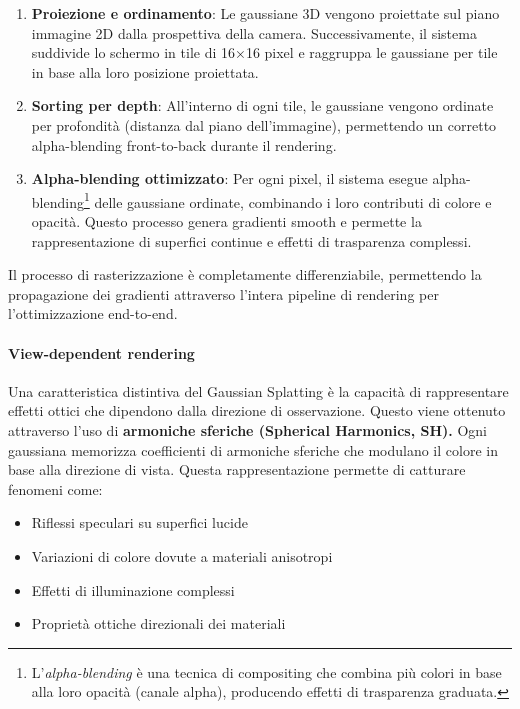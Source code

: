 \begin{enumerate}
    \item \textbf{Proiezione e ordinamento}: Le gaussiane 3D vengono proiettate sul piano immagine 2D dalla prospettiva della camera. Successivamente, il sistema suddivide lo schermo in tile di 16×16 pixel e raggruppa le gaussiane per tile in base alla loro posizione proiettata.
    \item \textbf{Sorting per depth}: All'interno di ogni tile, le gaussiane vengono ordinate per profondità (distanza dal piano dell'immagine), permettendo un corretto alpha-blending front-to-back durante il rendering.
    \item \textbf{Alpha-blending ottimizzato}: Per ogni pixel, il sistema esegue alpha-blending\footnote{L'\textit{alpha-blending} è una tecnica di compositing che combina più colori in base alla loro opacità (canale alpha), producendo effetti di trasparenza graduata.} delle gaussiane ordinate, combinando i loro contributi di colore e opacità. Questo processo genera gradienti smooth e permette la rappresentazione di superfici continue e effetti di trasparenza complessi.
\end{enumerate}

Il processo di rasterizzazione è completamente differenziabile, permettendo la propagazione dei gradienti attraverso l'intera pipeline di rendering per l'ottimizzazione end-to-end.

\paragraph{View-dependent rendering}
Una caratteristica distintiva del Gaussian Splatting è la capacità di rappresentare effetti ottici che dipendono dalla direzione di osservazione. Questo viene ottenuto attraverso l'uso di \textbf{armoniche sferiche (Spherical Harmonics, SH).}
\newline
\newline
Ogni gaussiana memorizza coefficienti di armoniche sferiche che modulano il colore in base alla direzione di vista. Questa rappresentazione permette di catturare fenomeni come:

\begin{itemize}
    \item Riflessi speculari su superfici lucide
    \item Variazioni di colore dovute a materiali anisotropi
    \item Effetti di illuminazione complessi
    \item Proprietà ottiche direzionali dei materiali
\end{itemize}

